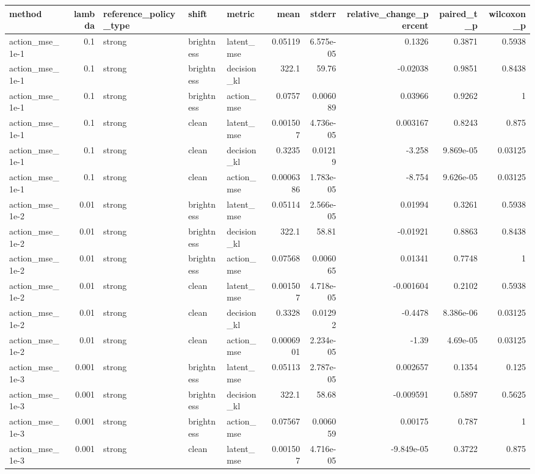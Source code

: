 \begin{tabular}{lrlllrrrrr}
\toprule
method & lambda & reference\_policy\_type & shift & metric & mean & stderr & relative\_change\_percent & paired\_t\_p & wilcoxon\_p \\
\midrule
action\_mse\_1e-1 & 0.1 & strong & brightness & latent\_mse & 0.05119 & 6.575e-05 & 0.1326 & 0.3871 & 0.5938 \\
action\_mse\_1e-1 & 0.1 & strong & brightness & decision\_kl & 322.1 & 59.76 & -0.02038 & 0.9851 & 0.8438 \\
action\_mse\_1e-1 & 0.1 & strong & brightness & action\_mse & 0.0757 & 0.006089 & 0.03966 & 0.9262 & 1 \\
action\_mse\_1e-1 & 0.1 & strong & clean & latent\_mse & 0.001507 & 4.736e-05 & 0.003167 & 0.8243 & 0.875 \\
action\_mse\_1e-1 & 0.1 & strong & clean & decision\_kl & 0.3235 & 0.01219 & -3.258 & 9.869e-05 & 0.03125 \\
action\_mse\_1e-1 & 0.1 & strong & clean & action\_mse & 0.0006386 & 1.783e-05 & -8.754 & 9.626e-05 & 0.03125 \\
action\_mse\_1e-2 & 0.01 & strong & brightness & latent\_mse & 0.05114 & 2.566e-05 & 0.01994 & 0.3261 & 0.5938 \\
action\_mse\_1e-2 & 0.01 & strong & brightness & decision\_kl & 322.1 & 58.81 & -0.01921 & 0.8863 & 0.8438 \\
action\_mse\_1e-2 & 0.01 & strong & brightness & action\_mse & 0.07568 & 0.006065 & 0.01341 & 0.7748 & 1 \\
action\_mse\_1e-2 & 0.01 & strong & clean & latent\_mse & 0.001507 & 4.718e-05 & -0.001604 & 0.2102 & 0.5938 \\
action\_mse\_1e-2 & 0.01 & strong & clean & decision\_kl & 0.3328 & 0.01292 & -0.4478 & 8.386e-06 & 0.03125 \\
action\_mse\_1e-2 & 0.01 & strong & clean & action\_mse & 0.0006901 & 2.234e-05 & -1.39 & 4.69e-05 & 0.03125 \\
action\_mse\_1e-3 & 0.001 & strong & brightness & latent\_mse & 0.05113 & 2.787e-05 & 0.002657 & 0.1354 & 0.125 \\
action\_mse\_1e-3 & 0.001 & strong & brightness & decision\_kl & 322.1 & 58.68 & -0.009591 & 0.5897 & 0.5625 \\
action\_mse\_1e-3 & 0.001 & strong & brightness & action\_mse & 0.07567 & 0.006059 & 0.00175 & 0.787 & 1 \\
action\_mse\_1e-3 & 0.001 & strong & clean & latent\_mse & 0.001507 & 4.716e-05 & -9.849e-05 & 0.3722 & 0.875 \\

\end{tabular}
